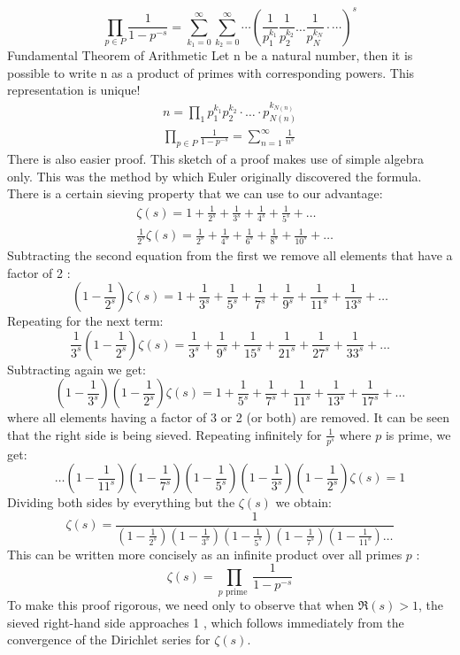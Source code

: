 	$$
	\prod_{p \in P} \frac{1}{1-p^{-s}}=\sum_{k_1=0}^{\infty} \sum_{k_2=0}^{\infty} \cdots\left(\frac{1}{p_1^{k_1}} \frac{1}{p_2^{k_2}} \ldots \frac{1}{p_N^{k_N}} \cdot \cdots\right)^s
	$$
	\newpage
	Fundamental Theorem of Arithmetic Let $\mathrm{n}$ be a natural number, then it is possible to write $\mathrm{n}$ as a product of primes with corresponding powers. This representation is unique!
	$$
	\begin{gathered}
		n=\prod_1 p_1^{k_1} p_2^{k_2} \cdot \ldots \cdot p_{N(n)}^{k_{N(n)}} \\
		\prod_{p \in P} \frac{1}{1-p^{-s}}=\sum_{n=1}^{\infty} \frac{1}{n^s}
	\end{gathered}
	$$
	There is also easier proof.
	This sketch of a proof makes use of simple algebra only. This was the method by which Euler originally discovered the formula. There is a certain sieving property that we can use to our advantage:
	$$
	\begin{aligned}
		& \zeta(s)=1+\frac{1}{2^s}+\frac{1}{3^s}+\frac{1}{4^s}+\frac{1}{5^s}+\ldots \\
		& \frac{1}{2^s} \zeta(s)=\frac{1}{2^s}+\frac{1}{4^s}+\frac{1}{6^s}+\frac{1}{8^s}+\frac{1}{10^s}+\ldots
	\end{aligned}
	$$
	Subtracting the second equation from the first we remove all elements that have a factor of 2 :
	$$
	\left(1-\frac{1}{2^s}\right) \zeta(s)=1+\frac{1}{3^s}+\frac{1}{5^s}+\frac{1}{7^s}+\frac{1}{9^s}+\frac{1}{11^s}+\frac{1}{13^s}+\ldots
	$$
	Repeating for the next term:
	$$
	\frac{1}{3^s}\left(1-\frac{1}{2^s}\right) \zeta(s)=\frac{1}{3^s}+\frac{1}{9^s}+\frac{1}{15^s}+\frac{1}{21^s}+\frac{1}{27^s}+\frac{1}{33^s}+\ldots
	$$
	Subtracting again we get:
	$$
	\left(1-\frac{1}{3^s}\right)\left(1-\frac{1}{2^s}\right) \zeta(s)=1+\frac{1}{5^s}+\frac{1}{7^s}+\frac{1}{11^s}+\frac{1}{13^s}+\frac{1}{17^s}+\ldots
	$$
	where all elements having a factor of 3 or 2 (or both) are removed.
	It can be seen that the right side is being sieved. Repeating infinitely for $\frac{1}{p^s}$ where $p$ is prime, we get:
	$$
	\ldots\left(1-\frac{1}{11^s}\right)\left(1-\frac{1}{7^s}\right)\left(1-\frac{1}{5^s}\right)\left(1-\frac{1}{3^s}\right)\left(1-\frac{1}{2^s}\right) \zeta(s)=1
	$$
	Dividing both sides by everything but the $\zeta(s)$ we obtain:
	$$
	\zeta(s)=\frac{1}{\left(1-\frac{1}{2^s}\right)\left(1-\frac{1}{3^s}\right)\left(1-\frac{1}{5^s}\right)\left(1-\frac{1}{7^s}\right)\left(1-\frac{1}{11^s}\right) \ldots}
	$$
	This can be written more concisely as an infinite product over all primes $p$ :
	$$
	\zeta(s)=\prod_{p \text { prime }} \frac{1}{1-p^{-s}}
	$$
	To make this proof rigorous, we need only to observe that when $\Re(s)>1$, the sieved right-hand side approaches 1 , which follows immediately from the convergence of the Dirichlet series for $\zeta(s)$.
	
